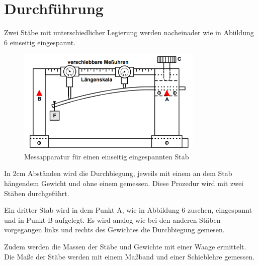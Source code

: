 \section{Durchführung}
\label{sec:Durchführung}


Zwei Stäbe mit unterschiedlicher Legierung werden nacheinader wie in Abiildung 6 einseitig eingespannt.

\begin{figure}[H]
  \centering
  \includegraphics[height=5cm]{einseitig.PNG}
  \caption{Messapparatur für einen einseitig eingespannten Stab}
  \label{fig:einseitig}
\end{figure}

In $2$cm Abständen wird die Durchbiegung, jeweils mit einem an dem Stab hängendem Gewicht
und ohne einem gemessen. Diese Prozedur wird mit zwei Stäben durchgeführt.

Ein dritter Stab wird in dem Punkt A, wie in Abbildung 6 zusehen, eingespannt und
in Punkt B aufgelegt. Es wird analog wie bei den anderen Stäben vorgegangen links
und rechts des Gewichtes die Durchbiegung gemesen.

Zudem werden die Massen der Stäbe und Gewichte mit einer Waage ermittelt. Die Maße der
Stäbe werden mit einem Maßband und einer Schieblehre gemessen.
